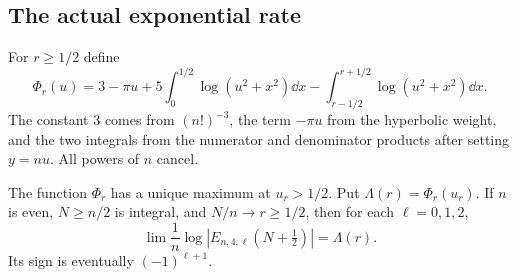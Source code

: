 \subsection{The actual exponential rate}
For $r\ge1/2$ define
\[
 \Phi_r(u)=3-\pi u+5\int_0^{1/2}\log(u^2+x^2)\dd x
                -\int_{r-1/2}^{r+1/2}\log(u^2+x^2)\dd x.
\]
The constant $3$ comes from $(n!)^{-3}$, the term $-\pi u$ from
the hyperbolic weight, and the two integrals from the numerator and
denominator products after setting $y=nu$. All powers of $n$ cancel.

\begin{theorem}\label{thm:pade-rate}
The function $\Phi_r$ has a unique maximum at $u_r>1/2$. Put
$\Lambda(r)=\Phi_r(u_r)$. If $n$ is even, $N\ge n/2$ is integral,
and $N/n\to r\ge1/2$, then for each $\ell=0,1,2$,
\[
 \lim\frac1n\log|E_{n,4,\ell}(N+\tfrac12)|=\Lambda(r).
\]
Its sign is eventually $(-1)^{\ell+1}$.
\end{theorem}
